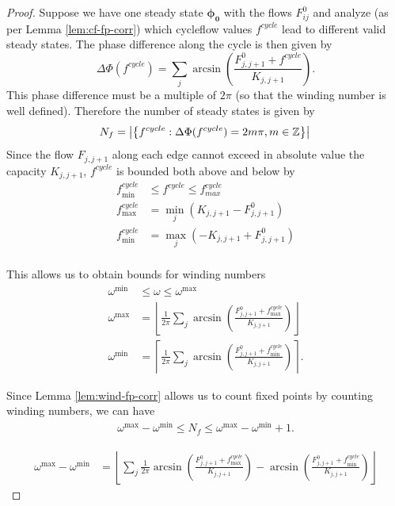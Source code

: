 \documentclass[10pt,aps,pra,onecolumn,superscriptaddress]{revtex4-1}
\newcommand{\ceil}[1]{\left\lceil#1\right\rceil}
\newcommand{\be}{\begin{equation}}
\newcommand{\ee}{\end{equation}}
\renewcommand{\vec}[1]{\boldsymbol{#1}}
\newcommand{\floor}[1]{\left\lfloor #1 \right \rfloor}
\begin{document}
\begin{proof}

Suppose we have one steady state $\vec{\phi_0}$
with the flows $F_{ij}^0$ and analyze (as per Lemma \ref{lem:cf-fp-corr})
which cycleflow values $f^{cycle}$ lead to different valid 
steady states.  The phase difference along the cycle is then given by
\be
   \Delta \Phi(f^{cycle}) = \sum_j\arcsin\left(\frac{F_{j,j+1}^0+f^{cycle}}{K_{j,j+1}}\right).
\ee
This phase difference must be a multiple of $2\pi$ (so that the winding number 
is well defined). Therefore the number
of steady states is given by
\be
   \label{eq:f^{cycle}-def}
  N_f = \left|\left\{ f^{cycle}:\Delta \Phi(f^{cycle})=2m\pi, 
  m\in \mathbb{Z} \right\}\right| \\
\ee
Since the flow $F_{j,j+1}$ along each edge cannot exceed in 
absolute value the capacity $K_{j,j+1}$, $f^{cycle}$ is bounded both above and below by
\begin{align}
\label{eq:fp_limits}
f^{cycle}_{\min} & \leq f^{cycle} \leq f^{cycle}_{max}\\
f^{cycle}_{\max}&=\min_{j} \left(K_{j,j+1}-F^0_{j,j+1} \right)\\
f^{cycle}_{\min}&=\max_{j} \left(-K_{j,j+1}+F^0_{j,j+1} \right)\\
\end{align}


This allows us to obtain bounds for winding numbers
\begin{align}
\label{eq:lim-omega}
\omega^{\min}& \leq \omega \leq \omega^{\max}\\
\omega^{\max}&=\floor{\frac{1}{2\pi}\sum_j \arcsin\left(\frac{F_{j,j+1}^0+f^{cycle}_{\max}}{K_{j,j+1}}\right)}\\
\omega^{\min}&=\ceil{\frac{1}{2\pi}\sum_j \arcsin\left(\frac{F_{j,j+1}^0+f^{cycle}_{\min}}{K_{j,j+1}}\right)}.
\end{align}

Since Lemma \ref{lem:wind-fp-corr} allows us to count fixed points by 
counting winding numbers, we can have
\begin{align}
\label{eq:omin-fps}
\omega^{\max}-\omega^{\min}\leq N_{f} \leq \omega^{\max}-\omega^{\min}+1.
\end{align}




\begin{align}
\label{eq:omegadiff}
\omega^{\max}-\omega^{\min} &=\floor{\sum_{j} \frac{1}{2\pi}
\arcsin\left(\frac{F_{j,j+1}^0+f^{cycle}_{\max}}{K_{j,j+1}}\right)  - 
\arcsin\left(\frac{F_{j,j+1}^0+f^{cycle}_{\min}}{K_{j,j+1}}\right)}
\end{align}



\end{proof}
\end{document}
